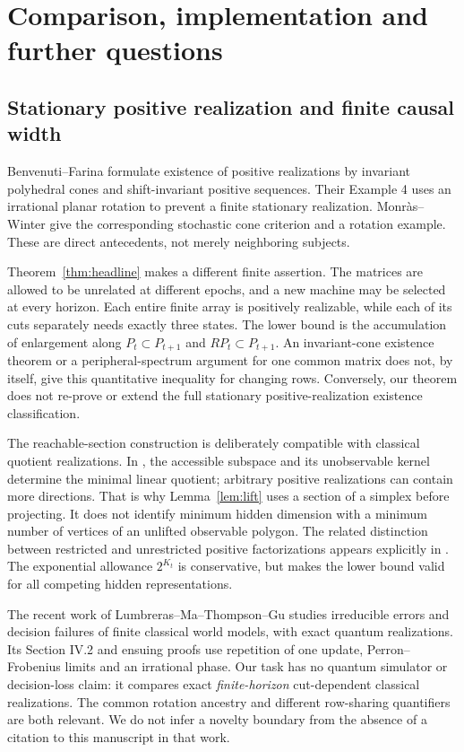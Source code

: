 \section{Comparison, implementation and further questions}
\label{sec:comparison}
\subsection{Stationary positive realization and finite causal width}
Benvenuti--Farina \cite[Theorems 2 and 3]{BF} formulate existence of
positive realizations by invariant polyhedral cones and shift-invariant
positive sequences. Their Example 4 uses an irrational planar rotation
to prevent a finite stationary realization. Monr\`as--Winter
\cite[Theorem 6 and Lemma 7]{MW} give the corresponding stochastic
cone criterion and a rotation example. These are direct antecedents,
not merely neighboring subjects.

Theorem~\ref{thm:headline} makes a different finite assertion. The
matrices are allowed to be unrelated at different epochs, and a new
machine may be selected at every horizon. Each entire finite array is
positively realizable, while each of its cuts separately needs exactly
three states. The lower bound is the accumulation of enlargement along
$P_t\subset P_{t+1}$ and $RP_t\subset P_{t+1}$. An invariant-cone
existence theorem or a peripheral-spectrum argument for one common
matrix does not, by itself, give this quantitative inequality for
changing rows. Conversely, our theorem does not re-prove or extend the
full stationary positive-realization existence classification.

The reachable-section construction is deliberately compatible with
classical quotient realizations. In \cite[Section 4, Theorem 9]{MW},
the accessible subspace and its unobservable kernel determine the
minimal linear quotient; arbitrary positive realizations can contain
more directions. That is why Lemma~\ref{lem:lift} uses a section of a
simplex before projecting. It does not identify minimum hidden dimension
with a minimum number of vertices of an unlifted observable polygon.
The related distinction between restricted and unrestricted positive
factorizations appears explicitly in \cite[Definition 1, Theorem 1]{GG}.
The exponential allowance $2^{K_t}$ is conservative, but makes the
lower bound valid for all competing hidden representations.

The recent work of Lumbreras--Ma--Thompson--Gu \cite{LMTG} studies
irreducible errors and decision failures of finite classical world
models, with exact quantum realizations. Its Section IV.2 and ensuing
proofs use repetition of one update, Perron--Frobenius limits and an
irrational phase. Our task has no quantum simulator or decision-loss
claim: it compares exact \emph{finite-horizon} cut-dependent classical
realizations. The common rotation ancestry and different row-sharing
quantifiers are both relevant. We do not infer a novelty boundary from
the absence of a citation to this manuscript in that work.

